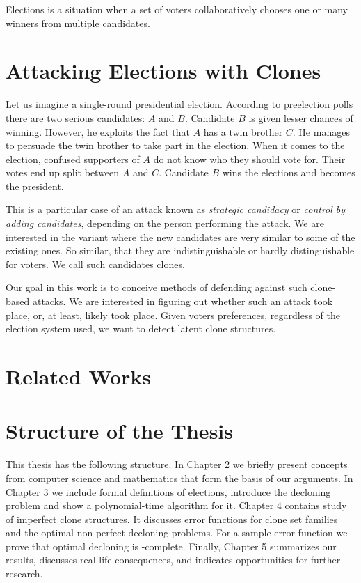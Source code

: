 Elections is a situation when a set of voters collaboratively chooses one or many winners from multiple candidates.

\section{Attacking Elections with Clones}

Let us imagine a single-round presidential election.
According to preelection polls there are two serious candidates: $A$ and $B$.
Candidate $B$ is given lesser chances of winning.
However, he exploits the fact that $A$ has a twin brother $C$.
He manages to persuade the twin brother to take part in the election.
When it comes to the election, confused supporters of $A$ do not know who they should vote for.
Their votes end up split between $A$ and $C$.
Candidate $B$ wins the elections and becomes the president.

This is a particular case of an attack known as \textit{strategic candidacy} or \textit{control by adding candidates}, %
depending on the person performing the attack.
We are interested in the variant where the new candidates are very similar to some of the existing ones.
So similar, that they are indistinguishable or hardly distinguishable for voters.
We call such candidates clones.

Our goal in this work is to conceive methods of defending against such clone-based attacks.
We are interested in figuring out whether such an attack took place, or, at least, likely took place.
Given voters preferences, regardless of the election system used, we want to detect latent clone structures.

\section{Related Works}


\section{Structure of the Thesis}

This thesis has the following structure.
In Chapter 2 we briefly present concepts from computer science
and mathematics that form the basis of our arguments.
In Chapter 3 we include formal definitions of elections, introduce the decloning problem
and show a polynomial-time algorithm for it.
Chapter 4 contains study of imperfect clone structures.
It discusses error functions for clone set families and the optimal non-perfect decloning problems.
For a sample error function we prove that optimal decloning is \np-complete.
Finally, Chapter 5 summarizes our results, discusses real-life consequences,
and indicates opportunities for further research.
